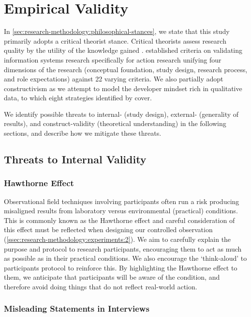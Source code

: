 \section{Empirical Validity}
\label{sec:research-methodology:empirical-validity}

In \cref{sec:research-methodology:philosophical-stances}, we state that this study primarily adopts a critical theorist stance. Critical theorists assess research quality by the utility of the knowledge gained \citep{Easterbrook:2007ws}. \citet{Lau:1999vs} established criteria on validating information systems research specifically for action research unifying four dimensions of the research (conceptual foundation, study design, research process, and role expectations) against 22 varying criteria. We also partially adopt constructivism as we attempt to model the developer mindset rich in qualitative data, to which eight strategies identified by \citet{Creswell:2017vn} cover.

We identify possible threats to internal- (study design), external- (generality of results), and construct-validity (theoretical understanding) in the following sections, and describe how we mitigate these threats.

\subsection{Threats to Internal Validity}

\subsubsection{Hawthorne Effect}

Observational field techniques involving participants often run a risk producing misaligned results from laboratory versus environmental (practical) conditions. This is commonly known as the Hawthorne effect  and careful consideration of this effect must be reflected when designing our controlled observation (\cref{ssec:research-methodology:experiments:2}). We aim to carefully explain the purpose and protocol to research participants, encouraging them to act as much as possible as in their practical conditions. We also encourage the `think-aloud' to participants protocol to reinforce this. By highlighting the Hawthorne effect to them, we anticipate that participants will be aware of the condition, and therefore avoid doing things that do not reflect real-world action.

\subsubsection{Misleading Statements in Interviews}

